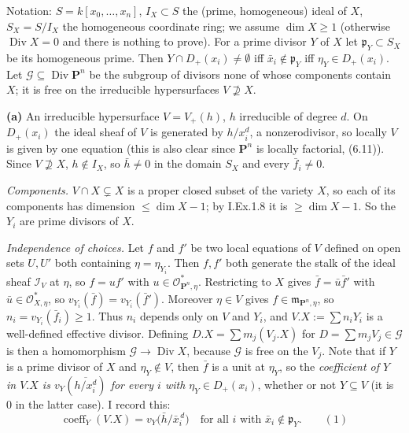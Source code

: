 \documentclass[11pt]{article}
\begin{document}
\pf
Notation: $S=k[x_0,\dots,x_n]$, $I_X\subset S$ the (prime, homogeneous) ideal of $X$, $S_X=S/I_X$ the homogeneous coordinate ring; we assume $\dim X\ge1$ (otherwise $\operatorname{Div}X=0$ and there is nothing to prove). For a prime divisor $Y$ of $X$ let $\mathfrak p_Y\subset S_X$ be its homogeneous prime. Then $Y\cap D_+(x_i)\neq\emptyset$ iff $\bar x_i\notin\mathfrak p_Y$ iff $\eta_Y\in D_+(x_i)$. Let $\mathcal G\subseteq\operatorname{Div}\mathbf P^n$ be the subgroup of divisors none of whose components contain $X$; it is free on the irreducible hypersurfaces $V\not\supseteq X$.

\textbf{(a)} An irreducible hypersurface $V=V_+(h)$, $h$ irreducible of degree $d$. On $D_+(x_i)$ the ideal sheaf of $V$ is generated by $h/x_i^{d}$, a nonzerodivisor, so locally $V$ is given by one equation (this is also clear since $\mathbf P^n$ is locally factorial, (6.11)). Since $V\not\supseteq X$, $h\notin I_X$, so $\bar h\ne0$ in the domain $S_X$ and every $\bar f_i\neq0$.

\emph{Components.} $V\cap X\subsetneq X$ is a proper closed subset of the variety $X$, so each of its components has dimension $\le\dim X-1$; by I.Ex.1.8 it is $\ge\dim X-1$. So the $Y_i$ are prime divisors of $X$.

\emph{Independence of choices.} Let $f$ and $f'$ be two local equations of $V$ defined on open sets $U,U'$ both containing $\eta=\eta_{Y_i}$. Then $f,f'$ both generate the stalk of the ideal sheaf $\mathcal I_V$ at $\eta$, so $f=uf'$ with $u\in\mathcal O_{\mathbf P^n,\eta}^*$. Restricting to $X$ gives $\bar f=\bar u\bar f'$ with $\bar u\in\mathcal O_{X,\eta}^*$, so $v_{Y_i}(\bar f)=v_{Y_i}(\bar f')$. Moreover $\eta\in V$ gives $f\in\mathfrak m_{\mathbf P^n,\eta}$, so $n_i=v_{Y_i}(\bar f_i)\ge1$. Thus $n_i$ depends only on $V$ and $Y_i$, and $V.X:=\sum n_iY_i$ is a well-defined effective divisor. Defining $D.X=\sum m_j(V_j.X)$ for $D=\sum m_jV_j\in\mathcal G$ is then a homomorphism $\mathcal G\to\operatorname{Div}X$, because $\mathcal G$ is free on the $V_j$. Note that if $Y$ is a prime divisor of $X$ and $\eta_Y\notin V$, then $\bar f$ is a unit at $\eta_Y$, so the \emph{coefficient of $Y$ in $V.X$ is $v_Y(\overline{h/x_i^d})$ for every $i$ with $\eta_Y\in D_+(x_i)$}, whether or not $Y\subseteq V$ (it is $0$ in the latter case). I record this:
\[
\operatorname{coeff}_Y(V.X)=v_Y\bigl(\bar h/\bar x_i^{\,d}\bigr)\quad\text{for all }i\text{ with }\bar x_i\notin\mathfrak p_Y.\qquad(1)
\]
\end{document}
